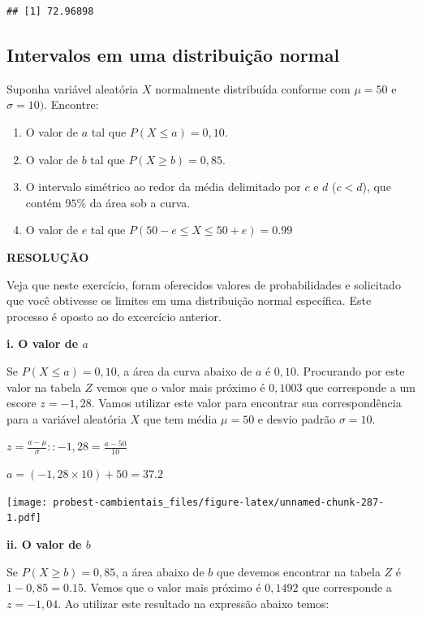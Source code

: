 \documentclass[
]{book}
\providecommand{\tightlist}{%
  \setlength{\itemsep}{0pt}\setlength{\parskip}{0pt}}
\begin{document}
\begin{verbatim}
## [1] 72.96898
\end{verbatim}

\hypertarget{intervalos-em-uma-distribuiuxe7uxe3o-normal}{%
\subsection{Intervalos em uma distribuição normal}\label{intervalos-em-uma-distribuiuxe7uxe3o-normal}}

Suponha variável aleatória \(X\) normalmente distribuída conforme com \(\mu = 50\) e \(\sigma = 10)\). Encontre:

\begin{enumerate}
\def\labelenumi{\roman{enumi}.}
\tightlist
\item
  O valor de \(a\) tal que \(P(X \le a) = 0,10\).
\item
  O valor de \(b\) tal que \(P(X \ge b) = 0,85\).
\item
  O intervalo simétrico ao redor da média delimitado por \(c\) e \(d\) (\(c < d\)), que contém \(95\%\) da área sob a curva.
\item
  O valor de \(e\) tal que \(P(50-e \le X \le 50+e) = 0.99\)
\end{enumerate}

\textbf{RESOLUÇÃO}

Veja que neste exercício, foram oferecidos valores de probabilidades e solicitado que você obtivesse os limites em uma distribuição normal específica. Este processo é oposto ao do excercício anterior.

\textbf{i. O valor de \(a\)}

Se \(P(X \le a) = 0,10\), a área da curva abaixo de \(a\) é \(0,10\). Procurando por este valor na tabela \(Z\) vemos que o valor mais próximo é \(0,1003\) que corresponde a um escore \(z = -1,28\). Vamos utilizar este valor para encontrar sua correspondência para a variável aleatória \(X\) que tem média \(\mu = 50\) e desvio padrão \(\sigma = 10\).

\(z = \frac{a - \mu}{\sigma} :: -1,28 = \frac{a - 50}{10}\)

\(a = (-1,28 \times 10) + 50 = 37.2\)

\texttt{[image: probest-cambientais\_files/figure-latex/unnamed-chunk-287-1.pdf]}

\textbf{ii. O valor de \(b\)}

Se \(P(X \ge b) = 0,85\), a área abaixo de \(b\) que devemos encontrar na tabela \(Z\) é \(1 - 0,85 = 0.15\). Vemos que o valor mais próximo é \(0,1492\) que corresponde a \(z = -1,04\). Ao utilizar este resultado na expressão abaixo temos:
\end{document}
